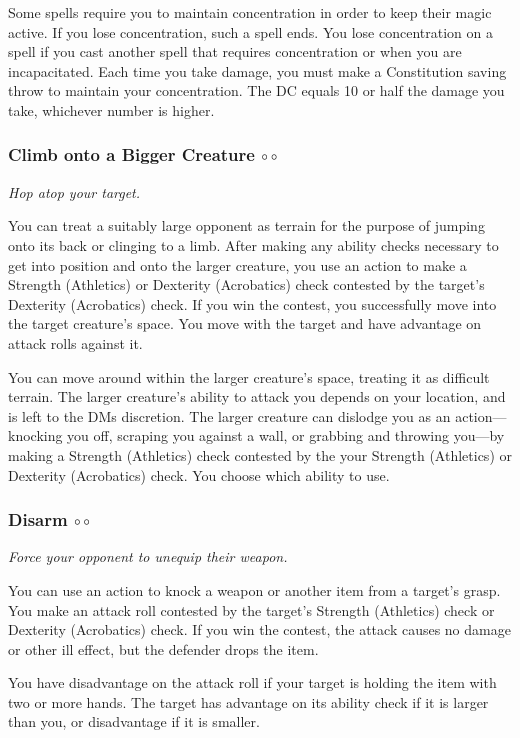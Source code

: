     Some spells require you to maintain concentration in order to keep their magic active.
    If you lose concentration, such a spell ends.
    You lose concentration on a spell if you cast another spell that requires concentration or when you are incapacitated.
    Each time you take damage, you must make a Constitution saving throw to maintain your concentration.
    The DC equals 10 or half the damage you take, whichever number is higher.
\subsubsection{Climb onto a Bigger Creature $\circ\circ$}  \label{act::climbontoabiggercreature}
    \textit{Hop atop your target.}

    You can treat a suitably large opponent as terrain for the purpose of jumping onto its back or clinging to a limb.
    After making any ability checks necessary to get into position and onto the larger creature, you use an action to make a Strength (Athletics) or Dexterity (Acrobatics) check contested by the target's Dexterity (Acrobatics) check.
    If you win the contest, you successfully move into the target creature's space.
    You move with the target and have advantage on attack rolls against it.

    You can move around within the larger creature's space, treating it as difficult terrain.
    The larger creature's ability to attack you depends on your location, and is left to the DMs discretion.
    The larger creature can dislodge you as an action—knocking you off, scraping you against a wall, or grabbing and throwing you—by making a Strength (Athletics) check contested by the your Strength (Athletics) or Dexterity (Acrobatics) check.
    You choose which ability to use.

\pagebreak

\subsubsection{Disarm $\circ\circ$} \label{act::disarm}
    \textit{Force your opponent to unequip their weapon.}

    You can use an action to knock a weapon or another item from a target's grasp.
    You make an attack roll contested by the target's Strength (Athletics) check or Dexterity (Acrobatics) check.
    If you win the contest, the attack causes no damage or other ill effect, but the defender drops the item.

    You have disadvantage on the attack roll if your target is holding the item with two or more hands.
    The target has advantage on its ability check if it is larger than you, or disadvantage if it is smaller.
